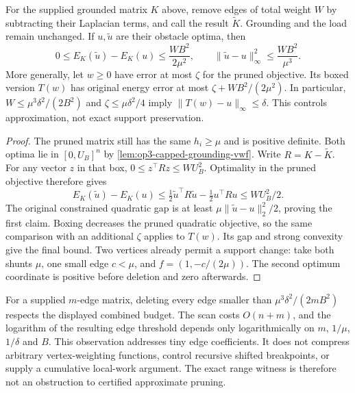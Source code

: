 \begin{lemma}
\label{lem:op3-grounded-edge-pruning}
For the supplied grounded matrix $K$ above, remove edges of total weight
$W$ by subtracting their Laplacian terms, and call the result $\widetilde K$.
Grounding and the load remain unchanged. If $u,\widetilde u$ are their
obstacle optima, then
\begin{equation}
 0\leq E_K(\widetilde u)-E_K(u)\leq\frac{WB^2}{2\mu^2},
 \qquad
 \|\widetilde u-u\|_\infty^2\leq\frac{WB^2}{\mu^3}.
 \label{eq:op3-pruning-accuracy}
\end{equation}
More generally, let $w\geq0$ have error at most $\zeta$ for the pruned
objective. Its boxed version $T(w)$ has original energy error at most
$\zeta+WB^2/(2\mu^2)$. In particular, $W\leq\mu^3\delta^2/(2B^2)$
and $\zeta\leq\mu\delta^2/4$ imply
$\|T(w)-u\|_\infty\leq\delta$.
This controls approximation, not exact support preservation.
\end{lemma}
\begin{proof}
The pruned matrix still has the same $h_i\geq\mu$ and is positive
definite. Both optima lie in $[0,U_B]^n$ by
\cref{lem:op3-capped-grounding-vwf}. Write $R=K-\widetilde K$.
For any vector $z$ in that box, $0\leq z^\top Rz\leq WU_B^2$.
Optimality in the pruned objective therefore gives
\[
 E_K(\widetilde u)-E_K(u)
 \leq\tfrac12\widetilde u^\top R\widetilde u-\tfrac12u^\top Ru
 \leq WU_B^2/2.
\]
The original constrained quadratic gap is at least
$\mu\|\widetilde u-u\|_2^2/2$, proving the first claim.
Boxing decreases the pruned quadratic objective, so the same comparison
with an additional $\zeta$ applies to $T(w)$. Its gap and strong convexity
give the final bound. Two vertices already permit a support change:
take both shunts $\mu$, one small edge $c<\mu$, and
$f=(1,-c/(2\mu))$. The second optimum coordinate is positive before
deletion and zero afterwards.
\end{proof}

For a supplied $m$-edge matrix, deleting every edge smaller than
$\mu^3\delta^2/(2mB^2)$ respects the displayed combined budget.
The scan costs $O(n+m)$, and the logarithm of the resulting edge threshold
depends only logarithmically on $m$, $1/\mu$, $1/\delta$ and $B$.
This observation addresses tiny edge coefficients. It does not compress
arbitrary vertex-weighting functions, control recursive shifted breakpoints,
or supply a cumulative local-work argument. The exact range witness is
therefore not an obstruction to certified approximate pruning.

